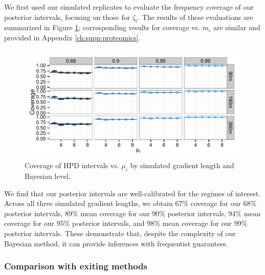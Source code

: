 We first used our simulated replicates to evaluate the frequency coverage of our posterior intervals, focusing on those for $\zeta_i$.
The results of these evaluations are summarized in Figure \ref{proteomics:fig:coverage_mu_hpd}; corresponding results for coverage vs. $m_i$ are similar and provided in Appendix \ref{ch:supp:proteomics}.
%
\begin{figure}
\centering
\includegraphics[width=\textwidth, page=1]{figures/proteomics/figures_coverage_sim}
\caption{Coverage of HPD intervals vs. $\mu_i$ by simulated gradient length and Bayesian level.
\label{proteomics:fig:coverage_mu_hpd}}
\end{figure}
%
We find that our posterior intervals are well-calibrated for the regimes of interest.
Across all three simulated gradient lengths, we obtain 67\% coverage for our 68\% posterior intervals, 89\% mean coverage for our 90\% posterior intervals, 94\% mean coverage for our 95\% posterior intervals, and 98\% mean coverage for our 99\% posterior intervals.
These demonstrate that, despite the complexity of our Bayesian method, it can provide inferences with frequentist guarantees.


\subsubsection{Comparison with exiting methods}
\label{proteomics:sec:compperf}

